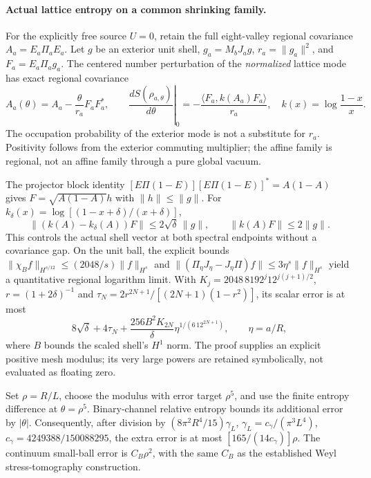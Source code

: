 \paragraph{Actual lattice entropy on a common shrinking family.}
For the explicitly free source $U=0$, retain the full eight-valley
regional covariance $A_a=E_a\Pi_aE_a$.  Let $g$ be an exterior unit shell,
$g_a=M_bJ_ag$, $r_a=\|g_a\|^2$, and $F_a=E_a\Pi_ag_a$.
The centered number perturbation of the \emph{normalized} lattice mode
has exact regional covariance
\[
 A_a(\theta)=A_a-\frac{\theta}{r_a}F_aF_a^*,\qquad
 \left.\frac{dS(\rho_{a,\theta})}{d\theta}\right|_0
 =-\frac{\langle F_a,k(A_a)F_a\rangle}{r_a},\quad
 k(x)=\log\frac{1-x}{x}.
\]
The occupation probability of the exterior mode is not a substitute for
$r_a$.  Positivity follows from the exterior commuting multiplier;
the affine family is regional, not an affine family through a pure
global vacuum.

The projector block identity
$[E\Pi(1-E)][E\Pi(1-E)]^*=A(1-A)$ gives
$F=\sqrt{A(1-A)}h$ with $\|h\|\leq\|g\|$.
For $k_\delta(x)=\log[(1-x+\delta)/(x+\delta)]$,
\[
 \|(k(A)-k_\delta(A))F\|\leq2\sqrt\delta\,\|g\|,
 \qquad \|k(A)F\|\leq2\|g\|.
\]
This controls the actual shell vector at both spectral endpoints without
a covariance gap.  On the unit ball, the explicit bounds
$\|\chi_Bf\|_{H^{s/12}}\leq(2048/s)\|f\|_{H^s}$ and
$\|(\Pi_\eta J_\eta-J_\eta\Pi)f\|\leq3\eta^s\|f\|_{H^s}$
yield a quantitative regional logarithm limit.  With
$K_j=2048\,8192^j12^{j(j+1)/2}$, $r=(1+2\delta)^{-1}$ and
$\tau_N=2r^{2N+1}/[(2N+1)(1-r^2)]$, its scalar error is at most
\[
 8\sqrt\delta+4\tau_N+
 \frac{256 B^2K_{2N}}{\delta}
       \eta^{1/(6\,12^{2N+1})},\qquad \eta=a/R,
\]
where $B$ bounds the scaled shell's $H^1$ norm.  The proof supplies an
explicit positive mesh modulus; its very large powers are retained
symbolically, not evaluated as floating zero.

Set $\rho=R/L$, choose the modulus with error target $\rho^5$, and use
the finite entropy difference at $\theta=\rho^5$.
Binary-channel relative entropy bounds its additional error by $|\theta|$.
Consequently, after division by
$(8\pi^2R^4/15)\gamma_L$, $\gamma_L=c_\gamma/(\pi^3L^4)$,
$c_\gamma=4249388/150088295$, the extra error is at most
$[165/(14c_\gamma)]\rho$.
The continuum small-ball error is $C_B\rho^2$, with the same $C_B$ as
the established Weyl stress-tomography construction.


